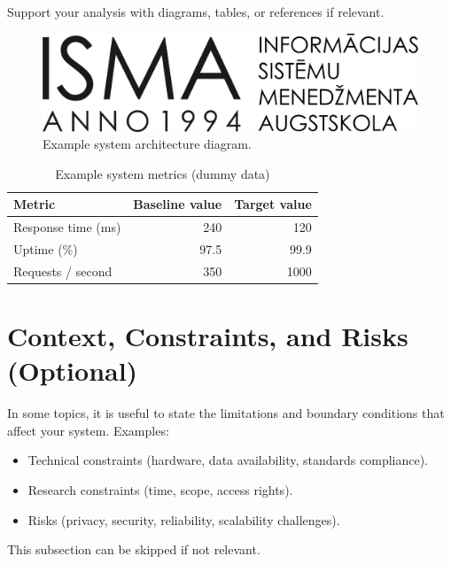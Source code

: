 Support your analysis with diagrams, tables, or references if relevant.

\begin{figure}[h]
  \centering
  \includegraphics[width=0.65\linewidth]{b_chapters/chapter1/assets/isma_logo.png}
  \caption{Example system architecture diagram.}
  \label{fig:analysis-example}
\end{figure}

{\singlespacing
\begin{table}[h]
  \caption{Example system metrics (dummy data)}
  \label{tab:analysis-example}
  \centering
  \begin{tabular}{lrr}
    \toprule
    Metric & Baseline value & Target value \\
    \midrule
    Response time (ms)  & 240   & 120   \\
    Uptime (\%)         & 97.5  & 99.9  \\
    Requests / second   & 350   & 1000  \\
    \bottomrule
  \end{tabular}
\end{table}
}

\section{Context, Constraints, and Risks (Optional)}
\label{sec:constraints}
In some topics, it is useful to state the limitations and boundary conditions that affect your system. Examples:

\begin{itemize}[leftmargin=1.2cm]
  \item Technical constraints (hardware, data availability, standards compliance).
  \item Research constraints (time, scope, access rights).
  \item Risks (privacy, security, reliability, scalability challenges).
\end{itemize}

This subsection can be skipped if not relevant.

